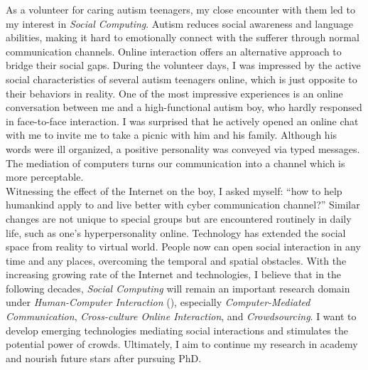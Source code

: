 As a volunteer for caring autism teenagers, my close encounter with them led to my interest in \textit{Social Computing}. 
Autism reduces social awareness and language abilities, 
making it hard to emotionally connect with the sufferer through normal communication channels.
Online interaction offers an alternative approach to bridge their social gaps.
During the volunteer days, I was impressed by the active social characteristics of several autism teenagers online,
which is just opposite to their behaviors in reality.
One of the most impressive experiences is an online conversation between me and a high-functional autism boy,
who hardly responsed in face-to-face interaction.
I was surprised that he actively opened an online chat with me to invite me to take a picnic with him and his family.
Although his words were ill organized, a positive personality was conveyed via typed messages.
The mediation of computers turns our communication into a channel which is more perceptable.\\

\noindent
Witnessing the effect of the Internet on the boy, I asked myself:
``how to help humankind apply to and live better with cyber communication channel?''
Similar changes are not unique to special groups but are encountered routinely in daily life,
such as one's hyperpersonality online.
Technology has extended the social space from reality to virtual world.
People now can open social interaction in any time and any places, overcoming the temporal and spatial obstacles.
With the increasing growing rate of the Internet and technologies, I believe that in the following decades, 
\textit{Social Computing} will remain an important research domain under \textit{Human-Computer Interaction} (),
especially \textit{Computer-Mediated Communication}, \textit{Cross-culture Online Interaction}, and \textit{Crowdsourcing}.
I want to develop emerging technologies mediating social interactions and stimulates the potential power of crowds. 
Ultimately, I aim to continue my research in academy and nourish future stars after pursuing PhD.\\




